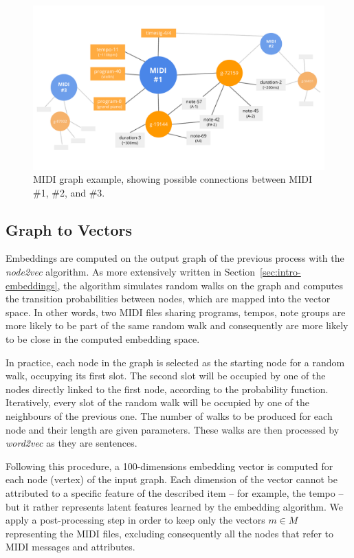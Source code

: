 \documentclass{article}
\newcommand{\secref}[1]{\mbox{Section~\ref{#1}}}
\begin{document}
\begin{figure}[ht!]
 \centerline{
 \includegraphics[width=\textwidth]{figs/graph-example.pdf}}
 \caption{MIDI graph example, showing possible connections between MIDI \#1, \#2, and \#3.}
 \label{fig:graph-example}
\end{figure}

\subsection{Graph to Vectors}
Embeddings are computed on the output graph of the previous process with the \textit{node2vec} algorithm. As more extensively written in \secref{sec:intro-embeddings}, the algorithm simulates random walks on the graph and computes the transition probabilities between nodes, which are mapped into the vector space. In other words, two MIDI files sharing programs, tempos, note groups are more likely to be part of the same random walk and consequently are more likely to be close in the computed embedding space.

In practice, each node in the graph is selected as the starting node for a random walk, occupying its first slot. The second slot will be occupied by one of the nodes directly linked to the first node, according to the probability function. Iteratively, every slot of the random walk will be occupied by one of the neighbours of the previous one. The number of walks to be produced for each node and their length are given parameters. These walks are then processed by \textit{word2vec} as they are sentences.

Following this procedure, a 100-dimensions embedding vector is computed for each node (vertex) of the input graph. Each dimension of the vector cannot be attributed to a specific feature of the described item -- for example, the tempo -- but it rather represents latent features learned by the embedding algorithm. 
We apply a post-processing step in order to keep only the vectors $m \in M$ representing the MIDI files, excluding consequently all the nodes that refer to MIDI messages and attributes.
\end{document}
